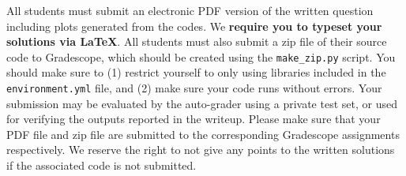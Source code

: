 All students must submit an electronic PDF version of the written question including plots generated from the codes. We
{\bf require you to typeset your solutions via \LaTeX}.
All students must also submit a zip file of
their source code to Gradescope, which should be created using the
\texttt{make\_zip.py} script. You
should make sure to (1) restrict yourself to only using libraries included in
the
\texttt{environment.yml} file, and (2) make sure your code runs without errors.
Your submission may be evaluated by the
auto-grader using a private test set, or used for verifying the outputs reported in the writeup. Please make sure that your PDF file and zip file are submitted to the corresponding Gradescope assignments respectively. We reserve the right to not give any points to the written solutions if the associated code is not submitted.

\vspace{0.1in}
